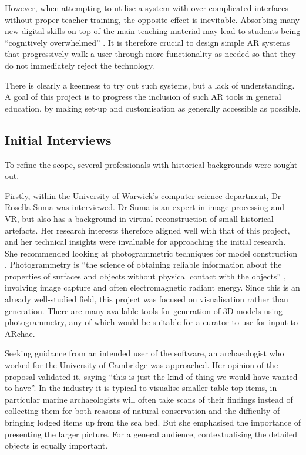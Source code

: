 \documentclass{article}
\begin{document}
However, when attempting to utilise a system with over-complicated interfaces without proper teacher training, the opposite effect is inevitable. Absorbing many new digital skills on top of the main teaching material may lead to students being “cognitively overwhelmed” \cite{education:overwhelm}. It is therefore crucial to design simple AR systems that progressively walk a user through more functionality as needed so that they do not immediately reject the technology. 

There is clearly a keenness to try out such systems, but a lack of understanding. A goal of this project is to progress the inclusion of such AR tools in general education, by making set-up and customisation as generally accessible as possible. 

\subsection{Initial Interviews}
To refine the scope, several professionals with historical backgrounds were sought out. 

Firstly, within the University of Warwick's computer science department, Dr Rosella Suma was interviewed. Dr Suma is an expert in image processing and VR, but also has a background in virtual reconstruction of small historical artefacts. Her research interests therefore aligned well with that of this project, and her technical insights were invaluable for approaching the initial research. She recommended looking at photogrammetric techniques for model construction \cite{interviews:rosellapaper}. Photogrammetry is ``the science of obtaining reliable information about the
properties of surfaces and objects without physical contact with the objects'' \cite{interviews:photogrammetry}, involving image capture and often electromagnetic radiant energy. Since this is an already well-studied field, this project was focused on visualisation rather than generation. There are many available tools for generation of 3D models using photogrammetry, any of which would be suitable for a curator to use for input to ARchae.

Seeking guidance from an intended user of the software, an archaeologist who worked for the University of Cambridge was approached. Her opinion of the proposal validated it, saying ``this is just the kind of thing we would have wanted to have''. In the industry it is typical to visualise smaller table-top items, in particular marine archaeologists will often take scans of their findings instead of collecting them for both reasons of natural conservation and the difficulty of bringing lodged items up from the sea bed. But she emphasised the importance of presenting the larger picture. For a general audience, contextualising the detailed objects is equally important. 
\end{document}
